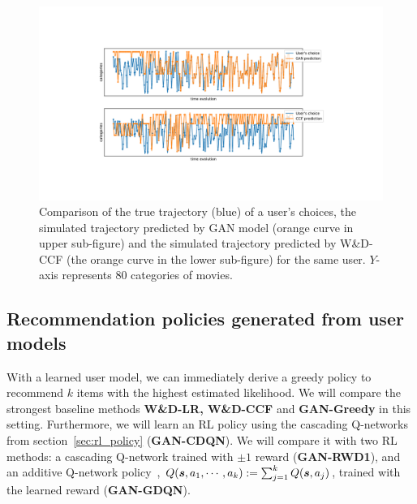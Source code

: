 \documentclass{article} %
\begin{document}
\begin{figure}[htbp]
\vspace{-4mm}
  \begin{minipage}[c]{0.55\textwidth}
    \centering
    \includegraphics[width=\textwidth]{user10_new}
  \end{minipage}\hfill
  \begin{minipage}[c]{0.45\textwidth}
    \centering
    \caption{\small Comparison of the true trajectory (blue) of a user's choices, the simulated trajectory predicted by {\small GAN} model (orange curve in upper sub-figure) and the simulated trajectory predicted by W\&D-CCF (the orange curve in the lower sub-figure) for the same user. $Y$-axis represents 80 categories of movies.
    } \label{fg:traj}
  \end{minipage}
  \vspace{-2mm}
\end{figure}

\vspace{-4mm}
\subsection{Recommendation policies generated from user models}\label{sec:experiment2}
\vspace{-2mm}

With a learned user model, we can immediately derive a greedy policy to recommend $k$ items with the highest estimated likelihood. We will compare the strongest baseline methods {\bf \small W\&D-LR, W\&D-CCF} and {\bf {\small GAN-Greedy}} in this setting. Furthermore, we will learn an RL policy using the cascading Q-networks from section~\ref{sec:rl_policy} ({\bf {\small GAN-CDQN}}). We will compare it with two RL methods: a cascading Q-network trained with $\pm 1$ reward ({\bf {\small GAN-RWD1}}), and an additive Q-network policy~\citep{He2016DeepRL}, {\small $Q({\bm{s}},a_1,\cdots,a_k) := \sum_{j=1}^kQ({\bm{s}},a_j)$}, trained with the learned reward ({\bf {\small GAN-GDQN}}). 
\end{document}
